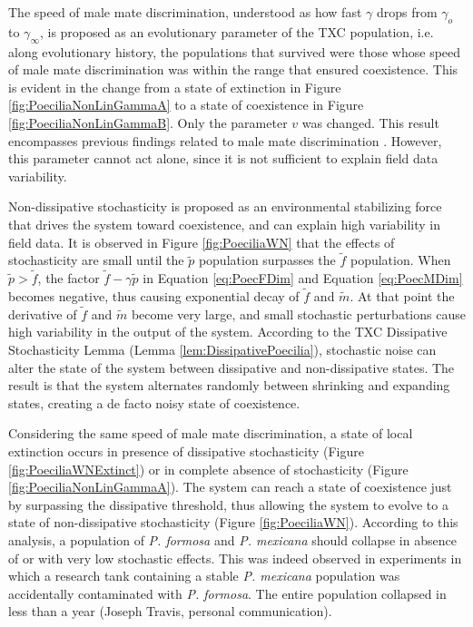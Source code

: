 	The speed of male mate discrimination, understood as how fast $\gamma$ drops from $\gamma_o$ to $\gamma_\infty$, is proposed as an evolutionary parameter of the TXC population, i.e. along evolutionary history, the populations that survived were those whose speed of male mate discrimination was within the range that ensured coexistence. This is evident in the change from a state of extinction in Figure \ref{fig:PoeciliaNonLinGammaA} to a state of coexistence in Figure \ref{fig:PoeciliaNonLinGammaB}. Only the parameter $v$ was changed. This result encompasses previous findings related to male mate discrimination \cite{Kokko:persist, Balsano:Poecilia, Kiester:Gynogenetic, Heubel:extinct}. However, this parameter cannot act alone, since it is not sufficient to explain field data variability. 
	
	Non-dissipative stochasticity is proposed as an environmental stabilizing force that drives the system toward coexistence, and can explain high variability in field data. It is observed in Figure \ref{fig:PoeciliaWN} that the effects of stochasticity are small until the $\tilde{p}$ population surpasses the $\tilde{f}$ population.  When $\tilde{p} > \tilde{f}$, the factor $\tilde{f}-\gamma \tilde{p}$ in Equation \ref{eq:PoecFDim} and Equation \ref{eq:PoecMDim} becomes negative, thus causing exponential decay of $\tilde{f}$ and $\tilde{m}$. 	At that point the derivative of $\tilde{f}$ and $\tilde{m}$ become very large, and small stochastic perturbations cause high variability in the output of the system. According to the TXC Dissipative Stochasticity Lemma (Lemma \ref{lem:DissipativePoecilia}), stochastic noise can alter the state of the system between dissipative and non-dissipative states. The result is that the system alternates randomly between shrinking and expanding states, creating a de facto noisy state of coexistence.
	
	Considering the same speed of male mate discrimination, a state of local extinction occurs in presence of dissipative stochasticity (Figure \ref{fig:PoeciliaWNExtinct}) or in complete absence of stochasticity (Figure \ref{fig:PoeciliaNonLinGammaA}). The system can reach a state of coexistence just by surpassing the dissipative threshold, thus allowing the system to evolve to a state of non-dissipative stochasticity (Figure \ref{fig:PoeciliaWN}). 
	According to this analysis, a population of \textit{P. formosa} and \textit{P. mexicana} should collapse in absence of or with very low stochastic effects. This was indeed observed in experiments in which a research tank containing a stable \textit{P. mexicana} population was accidentally contaminated with \textit{P. formosa}. The entire population collapsed in less than a year (Joseph Travis, personal communication). 
	
